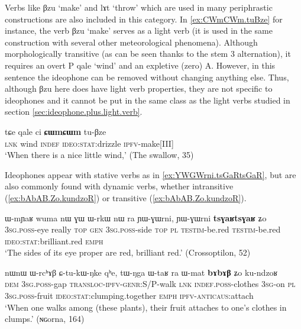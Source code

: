 \documentclass[oldfontcommands,oneside,a4paper,11pt]{article}
\newcommand{\ipa}[1]{{\phon \mbox{#1}}} %
\begin{document}
Verbs like \ipa{βzu} `make' and \ipa{lɤt} `throw' which are used in many periphrastic constructions are also included in this category. In \ref{ex:CWmCWm.tuBze} for instance, the verb \ipa{βzu} `make' serves as a light verb (it is used in the same construction with several other meteorological phenomena). Although morphologically transitive (as can be seen thanks to the stem 3 alternation), it requires an overt P \ipa{qale} `wind' and an expletive (zero) A. However, in this sentence the ideophone can be removed without changing anything else. Thus, although \ipa{βzu} here does have light verb properties, they are not specific to ideophones and it cannot be put in the same class as the light verbs studied in section \ref{sec:ideophone.plus.light.verb}.

\begin{exe}
\ex \label{ex:CWmCWm.tuBze}
\gll
\ipa{tɕe}  	\ipa{qale}  	\ipa{ci}  	\ipa{\textbf{ɕɯmɕɯm}}  	\ipa{tu-βze}  \\
\textsc{lnk} wind \textsc{indef} \textsc{ideo:stat}:drizzle \textsc{ipfv}-make[III] \\
\glt `When there is a nice little wind,' (The swallow, 35)
\end{exe}

Ideophones   appear with stative verbs as in \ref{ex:YWGWrni.tsGaRtsGaR}, but are also commonly found with 
dynamic verbs, whether intransitive (\ref{ex:bAbAB.Zo.kundzoR}) or transitive  (\ref{ex:bAbAB.Zo.kundzoR}).

\begin{exe}
\ex \label{ex:YWGWrni.tsGaRtsGaR}
\gll
\ipa{ɯ-mɲaʁ}  	\ipa{wuma}  	\ipa{nɯ}  	\ipa{ɣɯ}  	\ipa{ɯ-rkɯ}  	\ipa{nɯ} \ipa{ra}  	\ipa{ɲɯ-ɣɯrni,}  	\ipa{ɲɯ-ɣɯrni}  	\ipa{\textbf{tsɣaʁtsɣaʁ}}  	\ipa{ʑo}  \\
\textsc{3sg.poss}-eye really \textsc{top} \textsc{gen} \textsc{3sg.poss}-side \textsc{top} \textsc{pl} \textsc{testim}-be.red  \textsc{testim}-be.red \textsc{ideo:stat}:brilliant.red \textsc{emph} \\
 \glt `The sides of its eye proper are red, brilliant red.'  (Crossoptilon, 52)
 \end{exe}


\begin{exe}
\ex \label{ex:bAbAB.Zo.kundzoR}
\gll
\ipa{nɯnɯ}  	\ipa{ɯ-rcʰɤβ}  	\ipa{ɕ-tu-kɯ-ŋke}  	\ipa{qʰe,}  	\ipa{tɯ-ŋga}  	\ipa{ɯ-taʁ} \ipa{ra}  	\ipa{ɯ-mat}  	\ipa{\textbf{bɤbɤβ}}  	\ipa{ʑo}  	\ipa{ku-ndzoʁ} \\
\textsc{dem} \textsc{3sg.poss}-gap \textsc{transloc-ipfv-genr:}S/P-walk \textsc{lnk} \textsc{indef.poss}-clothes \textsc{3sg}-on \textsc{pl}  \textsc{3sg.poss}-fruit \textsc{ideo:stat}:clumping.together
\textsc{emph} \textsc{ipfv-anticaus}:attach \\
\glt `When one walks among (these plants), their fruit  attaches to one's clothes in clumps.' (ɴɢorna, 164)
\end{exe}
\end{document}
